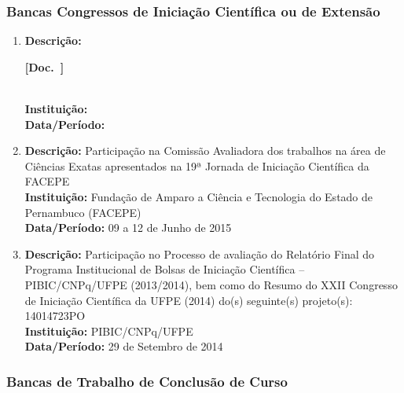 \documentclass[a4paper,oneside,10pt]{article}
\newcounter{document}%
\newcommand\Doc{{\addtocounter{document}{1}\mbox{\sffamily\bfseries [Doc. \arabic{document}]}}}
\begin{document}

\subsubsection{Bancas Congressos de Inicia\c{c}\~{a}o Cient\'{i}fica ou de Extens\~{a}o}
\vspace{0.3cm}

\begin{enumerate}
\renewcommand{\labelenumi}{{\large\bfseries\arabic{enumi}.}}
\vspace{0.3cm}

\item       \textbf{Descrição:} \Doc \\
            \textbf{Instituição:} \\
            \textbf{Data/Período:} 

\item       \textbf{Descrição:} Participação na Comissão Avaliadora dos trabalhos na área de Ciências Exatas apresentados na 19ª Jornada de Iniciação Científica da FACEPE \mbox{} \\
            \textbf{Instituição:} Fundação de Amparo a Ciência e Tecnologia do Estado de Pernambuco (FACEPE) \\
            \textbf{Data/Período:} 09 a 12 de Junho de 2015

\item       \textbf{Descrição:} Participação no Processo de avaliação do Relatório Final do Programa Institucional de Bolsas de Iniciação Científica – PIBIC/CNPq/UFPE (2013/2014), bem como do Resumo do XXII Congresso de Iniciação Científica da UFPE (2014) do(s) seguinte(s) projeto(s): 14014723PO \mbox{} \\
            \textbf{Instituição:} PIBIC/CNPq/UFPE\\
            \textbf{Data/Período:} 29 de Setembro de 2014

\end{enumerate}


\subsubsection{Bancas de Trabalho de Conclus\~{a}o de Curso}
\vspace{0.3cm}
\end{document}
